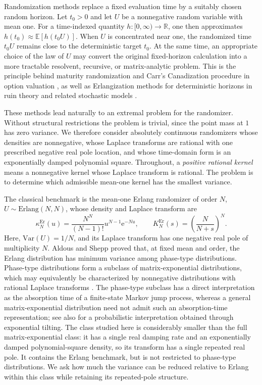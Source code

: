 \documentclass[11pt]{article}
\numberwithin{equation}{section}
\theoremstyle{definition}
\theoremstyle{remark}
\newcommand{\R}{\mathbb R}
\newcommand{\E}{\mathbb E}
\newcommand{\e}{\mathrm e}
\begin{document}
Randomization methods replace a fixed evaluation time by a suitably chosen
random horizon. Let $t_0>0$ and let $U$ be a nonnegative random variable
with mean one. For a time-indexed quantity $h\colon[0,\infty)\to\R$, one
then approximates $h(t_0)\approx \E[h(t_0U)]$.
When $U$ is concentrated near one, the randomized time $t_0U$ remains close
to the deterministic target $t_0$. At the same time, an appropriate choice
of the law of $U$ may convert the original fixed-horizon calculation into a
more tractable resolvent, recursive, or matrix-analytic problem. This is the
principle behind maturity randomization and Carr's Canadization procedure in
option valuation \cite{carr1998,bouchardelkarouitouzi2005}, as well as
Erlangization methods for deterministic horizons in ruin theory and related
stochastic models \cite{asmussenavramusabel2002,bladtnielsenperalta2019}.

These methods lead naturally to an extremal problem for the randomizer.
Without structural restrictions the problem is trivial, since the point mass
at $1$ has zero variance. We therefore consider absolutely continuous
randomizers whose densities are nonnegative, whose Laplace transforms are
rational with one prescribed negative real pole location, and whose
time-domain form is an exponentially damped polynomial square. Throughout, a \emph{positive rational kernel} means a nonnegative kernel whose Laplace transform is rational. The
problem is to determine which admissible mean-one kernel has the smallest
variance.

The classical benchmark is the mean-one Erlang randomizer of order $N$, $U\sim \text{Erlang}(N,N)$, whose density and Laplace transform are
\begin{equation}\label{eq:intro-erlang}
\kappa_N^{\mathrm{Er}}(u)
\mathrel{{=}}
\frac{N^N}{(N-1)!}u^{N-1}\e^{-Nu},
\qquad
K_N^{\mathrm{Er}}(s)
\mathrel{{=}}
\left(\frac{N}{N+s}\right)^N.
\end{equation}
Here, $\text{Var}(U) = 1/N$, and its Laplace transform has one negative real pole
of multiplicity $N$. Aldous and Shepp \cite{aldousshepp1987} proved that,
at fixed mean and order, the Erlang distribution has minimum variance among
phase-type distributions. Phase-type distributions form a subclass of
matrix-exponential distributions, which may equivalently be characterized
by nonnegative distributions with rational Laplace transforms
\cite{bladtnielsen2017}. The phase-type subclass has a direct interpretation
as the absorption time of a finite-state Markov jump process, whereas a
general matrix-exponential distribution need not admit such an absorption-time
representation; see also \cite{peralta2023} for a probabilistic interpretation
obtained through exponential tilting. The class studied here is considerably
smaller than the full matrix-exponential class: it has a single real damping
rate and an exponentially damped polynomial-square density, so its transform
has a single repeated real pole. It contains
the Erlang benchmark, but is not restricted to phase-type distributions. We ask
how much the variance can be reduced relative to Erlang within this class while
retaining its repeated-pole structure.
\end{document}
